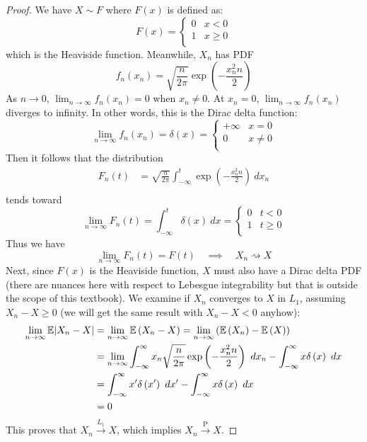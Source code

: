 \documentclass[a4paper]{article}
\begin{document}
\begin{proof}[Proof] 
We have \(X \sim F\) where \(F\left( x \right)\) is defined as:
\[
	F\left( x \right) = \begin{cases}
		0 & x < 0 \\
		1 & x \ge 0 \\
	\end{cases}
\]
which is the Heaviside function. Meanwhile, \(X_{n}\) has \textsf{PDF}
\[
	f_{n}\left( x_{n} \right) = \sqrt{\frac{n}{2 \pi }} \exp\left( -\frac{x^{2}_{n} n}{2} \right)
\]
As \(n \rightarrow 0\), \(\lim_{n \to \infty} f_{n}\left( x_{n} \right) = 0\) when \(x_{n} \neq 0\). At \(x_{n} = 0\), \(\lim_{n \to \infty} f_{n}\left( x_{n} \right)\) diverges to infinity. In other words, this is the Dirac delta function:
\[
	\lim_{n \to \infty} f_{n}\left( x_{n} \right) = \delta \left( x \right) = \begin{cases}
		+\infty & x = 0 \\
		0 & x \neq 0 \\
	\end{cases} 
\]
Then it follows that the distribution
\begin{align*}
	F_{n}\left( t \right) & = \sqrt{\frac{n}{2 \pi }} \int^{t}_{-\infty} \exp\left( -\frac{x^{2}_{n} n}{2} \right) \ dx_{n}   \\ 
\end{align*}
tends toward
\[
	\lim_{n \to \infty} F_{n} \left( t \right)  = \int^{t}_{-\infty} \delta \left( x \right)  \ dx = \begin{cases}
		0 & t < 0 \\
		1 & t \ge 0 \\
	\end{cases} 
\]
Thus we have
\[
	\lim_{n \to \infty} F_{n}\left( t \right) = F \left( t \right) \quad \implies \quad X_{n} \rightsquigarrow X
\]
Next, since \(F \left( x \right) \) is the Heaviside function, \(X\) must also have a Dirac delta \textsf{PDF} (there are nuances here with respect to Lebesgue integrability but that is outside the scope of this textbook). We examine if \(X_{n}\) converges to \(X\) in \(L_{1}\), assuming \(X_{n} - X \ge 0\) (we will get the same result with \(X_{n} - X < 0\) anyhow):
\begin{align*}
	\lim_{n \to \infty} \E \abs{X_{n} - X} & = \lim_{n \to \infty} \E\left( X_{n} - X \right) = \lim_{n \to \infty} \left( \E\left( X_{n} \right) - \E\left( X \right) \right)  \\
	 & = \lim_{n \to \infty} \int^{\infty}_{-\infty} x_{n} \sqrt{\frac{n}{2 \pi }} \exp\left( -\frac{x^{2}_{n} n }{2} \right) \ dx_{n} - \int^{\infty}_{-\infty} x \delta \left( x \right)  \ dx   \\
	 & = \int^{\infty}_{-\infty} x' \delta \left( x' \right)  \ dx'- \int^{\infty}_{-\infty} x \delta \left( x \right)  \ dx \\
	 & = 0
\end{align*}
This proves that \(X_{n} \xrightarrow{L_{1}} X\), which implies \(X_{n} \xrightarrow{\text{ P }} X\).
\end{proof}
\end{document}
